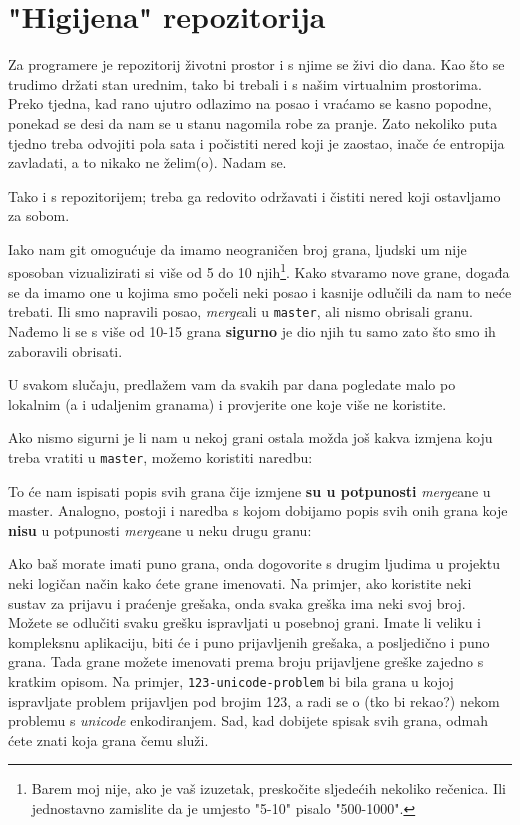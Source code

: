 \chapter*{"Higijena" repozitorija}

Za programere je repozitorij životni prostor i s njime se živi dio dana.
Kao što se trudimo držati stan urednim, tako bi trebali i s našim virtualnim prostorima.
Preko tjedna, kad rano ujutro odlazimo na posao i vraćamo se kasno popodne, ponekad se desi da nam se u stanu nagomila robe za pranje.
Zato nekoliko puta tjedno treba odvojiti pola sata i počistiti nered koji je zaostao, inače će entropija zavladati, a to nikako ne želim(o).
Nadam se.

Tako i s repozitorijem; treba ga redovito održavati i čistiti nered koji ostavljamo za sobom.


Iako nam git omogućuje da imamo neograničen broj grana, ljudski um nije sposoban vizualizirati si više od 5 do 10 njih\footnote{Barem moj nije, ako je vaš izuzetak, preskočite sljedećih nekoliko rečenica. Ili jednostavno zamislite da je umjesto "5-10" pisalo "500-1000".}.
Kako stvaramo nove grane, događa se da imamo one u kojima smo počeli neki posao i kasnije odlučili da nam to neće trebati.
Ili smo napravili posao, \emph{merge}ali u \verb+master+, ali nismo obrisali granu.
Nađemo li se s više od 10-15 grana \textbf{sigurno} je dio njih tu samo zato što smo ih zaboravili obrisati.

U svakom slučaju, predlažem vam da svakih par dana pogledate malo po lokalnim (a i udaljenim granama) i provjerite one koje više ne koristite.

Ako nismo sigurni je li nam u nekoj grani ostala možda još kakva izmjena koju treba vratiti u \verb+master+, možemo koristiti naredbu:


To će nam ispisati popis svih grana čije izmjene \textbf{su u potpunosti} \emph{merge}ane u master. 
Analogno, postoji i naredba s kojom dobijamo popis svih onih grana koje \textbf{nisu} u potpunosti \emph{merge}ane u neku drugu granu:



Ako baš morate imati puno grana, onda dogovorite s drugim ljudima u projektu neki logičan način kako ćete grane imenovati.
Na primjer, ako koristite neki sustav za prijavu i praćenje grešaka, onda svaka greška ima neki svoj broj.
Možete se odlučiti svaku grešku ispravljati u posebnoj grani. 
Imate li veliku i kompleksnu aplikaciju, biti će i puno prijavljenih grešaka, a posljedično i puno grana.
Tada grane možete imenovati prema broju prijavljene greške zajedno s kratkim opisom.
Na primjer, \verb+123-unicode-problem+ bi bila grana u kojoj ispravljate problem prijavljen pod brojim 123, a radi se o (tko bi rekao?) nekom problemu s \emph{unicode} enkodiranjem.
Sad, kad dobijete spisak svih grana, odmah ćete znati koja grana čemu služi.

